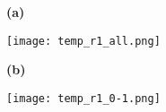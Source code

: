\documentclass[preview]{standalone}
\begin{document}
\begin{figure}
  \begin{subfigure}[t]{0.05\textwidth}
    \textbf{\normalsize{(a)}}
  \end{subfigure}
  \begin{subfigure}[t]{0.45\textwidth}
    \texttt{[image: temp\_r1\_all.png]}
  \end{subfigure}
  \begin{subfigure}[t]{0.05\textwidth}
    \textbf{\normalsize{(b)}}
  \end{subfigure}
  \begin{subfigure}[t]{0.45\textwidth}
    \texttt{[image: temp\_r1\_0-1.png]}
  \end{subfigure}
  
  
\end{figure}
\end{document}
